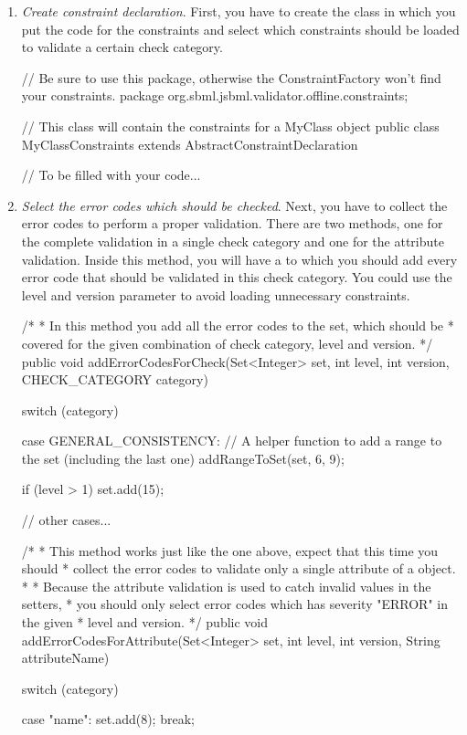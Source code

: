 \begin{enumerate}

\item \emph{Create constraint declaration}. First, you have to create the
  class in which you put the code for the constraints and select which
  constraints should be loaded to validate a certain check category.

\begin{example}[style=java, title={Create constraint declaration class}]
// Be sure to use this package, otherwise the ConstraintFactory won't find your constraints.
package org.sbml.jsbml.validator.offline.constraints;

// This class will contain the constraints for a MyClass object
public class MyClassConstraints extends AbstractConstraintDeclaration {
	
	// To be filled with your code...
}
\end{example}

\item \emph{Select the error codes which should be checked}.  Next, you
  have to collect the error codes to perform a proper validation. There are
  two methods, one for the complete validation in a single check category and
  one for the attribute validation. Inside this method, you will have a
   to which you should add every error code that should be
  validated in this check category. You could use the level and version
  parameter to avoid loading unnecessary constraints.

\begin{example}[style=java, title={Select error codes}]
  /*
   * In this method you add all the error codes to the set, which should be 
   * covered for the given combination of check category, level and version.
   */
  public void addErrorCodesForCheck(Set<Integer> set, int level, int version,
    CHECK_CATEGORY category) {
    
    switch (category) {
    case GENERAL_CONSISTENCY:
    	// A helper function to add a range to the set (including the last one)
    	addRangeToSet(set, 6, 9);
    		
    	if (level > 1)
    	{
    		set.add(15);
    	}
    
    // other cases...
  	
    }
  }

  /*
   * This method works just like the one above, expect that this time you should
   * collect the error codes to validate only a single attribute of a object.
   *
   * Because the attribute validation is used to catch invalid values in the setters,
   * you should only select error codes which has severity "ERROR" in the given
   *  level and version.
   */
  public void addErrorCodesForAttribute(Set<Integer> set, int level,
    int version, String attributeName) {
	switch (category) {
    case "name":
    	set.add(8);
    	break;
    	
}}
\end{example}
\end{enumerate}
